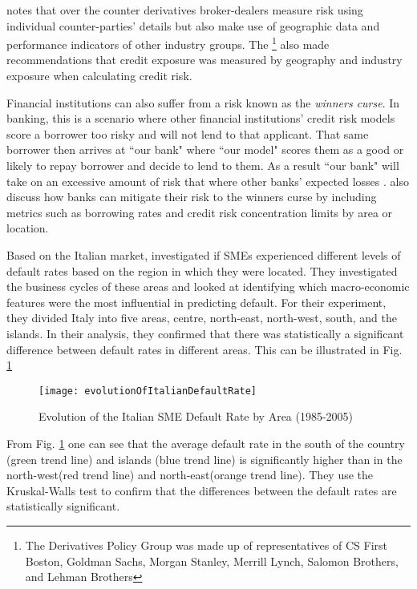 \cite{fama_term_1986} notes that over the counter derivatives broker-dealers measure risk using individual counter-parties' details but also make use of geographic data and performance indicators of other industry groups. The \cite{derivatives_policy_group_framework_1995} \footnote{The Derivatives Policy Group was made up of representatives of CS First Boston, Goldman Sachs, Morgan Stanley, Merrill Lynch, Salomon Brothers, and Lehman Brothers} also made recommendations that credit exposure was measured by geography and industry exposure when calculating credit risk.

Financial institutions can also suffer from a risk known as the \textit{winners curse}. In banking, this is a scenario where other financial institutions' credit risk models score a borrower too risky and will not lend to that applicant. That same borrower then arrives at ``our bank" where ``our model" scores them as a good or likely to repay borrower and decide to lend to them. As a result ``our bank" will take on an excessive amount of risk that where other banks' expected losses \citep{duffie_credit_2012}. \cite{duffie_credit_2012} also discuss how banks can mitigate their risk to the winners curse by including metrics such as borrowing rates and credit risk concentration limits by area or location.

Based on the Italian market, \citep{di_pietro_regional} investigated if SMEs experienced different levels of default rates based on the region in which they were located. They investigated the business cycles of these areas and looked at identifying which macro-economic features were the most influential in predicting default. For their experiment, they divided Italy into five areas, centre, north-east, north-west, south, and the islands. In their analysis, they confirmed that there was statistically a significant difference between default rates in different areas. This can be illustrated in Fig. \ref{fig:evolutionOfItalianDefaultRate}

\begin{figure}[H]
	\texttt{[image: evolutionOfItalianDefaultRate]}
	\caption{Evolution of the Italian SME Default Rate by Area (1985-2005) \\
	\cite[Source:][]{di_pietro_regional}		
			}
	\label{fig:evolutionOfItalianDefaultRate}
\end{figure}

From Fig. \ref{fig:evolutionOfItalianDefaultRate} one can see that the average default rate in the south of the country (green trend line) and islands (blue trend line) is significantly higher than in the north-west(red trend line) and north-east(orange trend line). They use the Kruskal-Walls test to confirm that the differences between the default rates are statistically significant.


